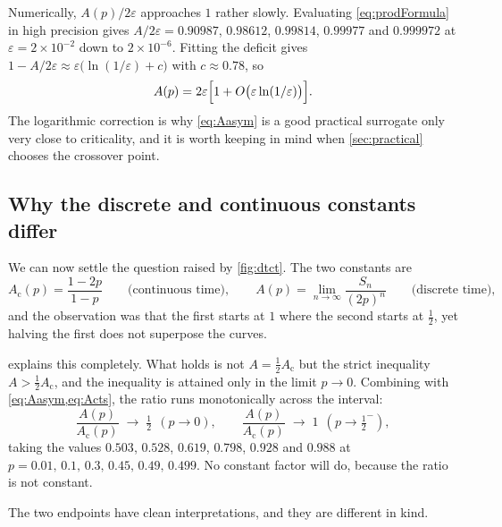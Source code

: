 \begin{remark}
\label{rem:rate}
Numerically, $A(p)/2\varepsilon$ approaches $1$ rather slowly. Evaluating
\cref{eq:prodFormula} in high precision gives $A/2\varepsilon = 0.90987$, $0.98612$,
$0.99814$, $0.99977$ and $0.999972$ at $\varepsilon = 2\times10^{-2}$ down to
$2\times10^{-6}$. Fitting the deficit gives
$1 - A/2\varepsilon \approx \varepsilon\bigl(\ln(1/\varepsilon)+c\bigr)$ with
$c\approx0.78$, so
\begin{equation*}
A(p) = 2\varepsilon\Bigl[1+O\bigl(\varepsilon\ln(1/\varepsilon)\bigr)\Bigr].
\end{equation*}
The logarithmic correction is why \cref{eq:Aasym} is a good practical surrogate only
very close to criticality, and it is worth keeping in mind when \cref{sec:practical}
chooses the crossover point.
\end{remark}

\subsection{Why the discrete and continuous constants differ}
\label{sec:compare}

We can now settle the question raised by \cref{fig:dtct}. The two constants are
\begin{equation*}
A_{\text{c}}(p) = \frac{1-2p}{1-p}
\qquad\text{(continuous time)},
\qquad
A(p) = \lim_{n\to\infty}\frac{S_n}{(2p)^n}
\qquad\text{(discrete time)},
\end{equation*}
and the observation was that the first starts at $1$ where the second starts at
$\tfrac12$, yet halving the first does not superpose the curves.

 explains this completely. What holds is not
$A = \tfrac12 A_{\text{c}}$ but the strict inequality $A > \tfrac12 A_{\text{c}}$, and
the inequality is attained only in the limit $p\to0$. Combining with
\cref{eq:Aasym,eq:Acts}, the ratio runs monotonically across the interval:
\begin{equation}
\label{eq:ratiolimits}
\frac{A(p)}{A_{\text{c}}(p)} \;\longrightarrow\; \tfrac12 \ \ (p\to0),
\qquad
\frac{A(p)}{A_{\text{c}}(p)} \;\longrightarrow\; 1 \ \ (p\to\tfrac12^-),
\end{equation}
taking the values $0.503$, $0.528$, $0.619$, $0.798$, $0.928$ and $0.988$ at
$p = 0.01,\,0.1,\,0.3,\,0.45,\,0.49,\,0.499$. No constant factor will do, because the
ratio is not constant.

The two endpoints have clean interpretations, and they are different in kind.

